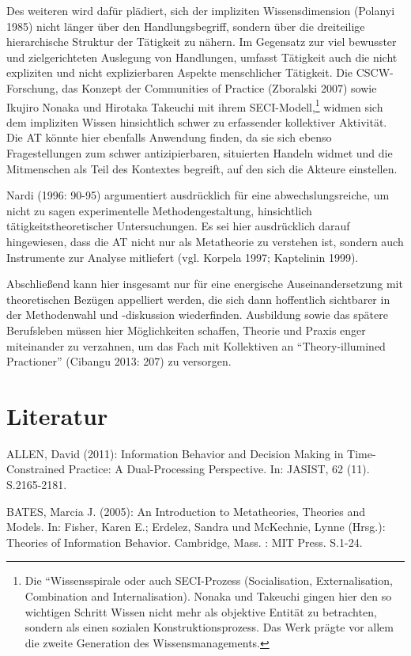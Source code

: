 \documentclass[a4paper,
fontsize=11pt,
oneside,
numbers=noperiodatend,
parskip=half-,
bibliography=totoc,
final
]{scrartcl}
\begin{document}
Des weiteren wird dafür plädiert, sich der impliziten Wissensdimension
(Polanyi 1985) nicht länger über den Handlungsbegriff, sondern über die
dreiteilige hierarchische Struktur der Tätigkeit zu nähern. Im Gegensatz
zur viel bewusster und zielgerichteten Auslegung von Handlungen, umfasst
Tätigkeit auch die nicht expliziten und nicht explizierbaren Aspekte
menschlicher Tätigkeit. Die CSCW-Forschung, das Konzept der Communities
of Practice (Zboralski 2007) sowie Ikujiro Nonaka und Hirotaka Takeuchi
mit ihrem SECI-Modell,\footnote{Die ``Wissensspirale oder auch
  SECI-Prozess (Socialisation, Externalisation, Combination and
  Internalisation). Nonaka und Takeuchi gingen hier den so wichtigen
  Schritt Wissen nicht mehr als objektive Entität zu betrachten, sondern
  als einen sozialen Konstruktionsprozess. Das Werk prägte vor allem die
  zweite Generation des Wissensmanagements.} widmen sich dem impliziten
Wissen hinsichtlich schwer zu erfassender kollektiver Aktivität. Die AT
könnte hier ebenfalls Anwendung finden, da sie sich ebenso
Fragestellungen zum schwer antizipierbaren, situierten Handeln widmet
und die Mitmenschen als Teil des Kontextes begreift, auf den sich die
Akteure einstellen.

Nardi (1996: 90-95) argumentiert ausdrücklich für eine
abwechslungsreiche, um nicht zu sagen experimentelle Methodengestaltung,
hinsichtlich tätigkeitstheoretischer Untersuchungen. Es sei hier
ausdrücklich darauf hingewiesen, dass die AT nicht nur als Metatheorie
zu verstehen ist, sondern auch Instrumente zur Analyse mitliefert (vgl.
Korpela 1997; Kaptelinin 1999).

Abschließend kann hier insgesamt nur für eine energische
Auseinandersetzung mit theoretischen Bezügen appelliert werden, die sich
dann hoffentlich sichtbarer in der Methodenwahl und -diskussion
wiederfinden. Ausbildung sowie das spätere Berufsleben müssen hier
Möglichkeiten schaffen, Theorie und Praxis enger miteinander zu
verzahnen, um das Fach mit Kollektiven an \enquote{Theory-illumined
Practioner} (Cibangu 2013: 207) zu versorgen.

\section*{Literatur}\label{literatur}

ALLEN, David (2011): Information Behavior and Decision Making in
Time-Constrained Practice: A Dual-Processing Perspective. In: JASIST, 62
(11). S.2165-2181.

BATES, Marcia J. (2005): An Introduction to Metatheories, Theories and
Models. In: Fisher, Karen E.; Erdelez, Sandra und McKechnie, Lynne
(Hrsg.): Theories of Information Behavior. Cambridge, Mass. : MIT Press.
S.1-24.
\end{document}
